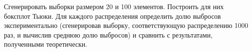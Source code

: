 \item Сгенерировать выборки размером 20 и 100 элементов.
        \newline Построить для них боксплот Тьюки.
        Для каждого распределения определить долю выбросов экспериментально (сгенерировав выборку, соответствующую распределению 1000
        раз, и вычислив среднюю долю выбросов) и сравнить с результатами,
        полученными теоретически.